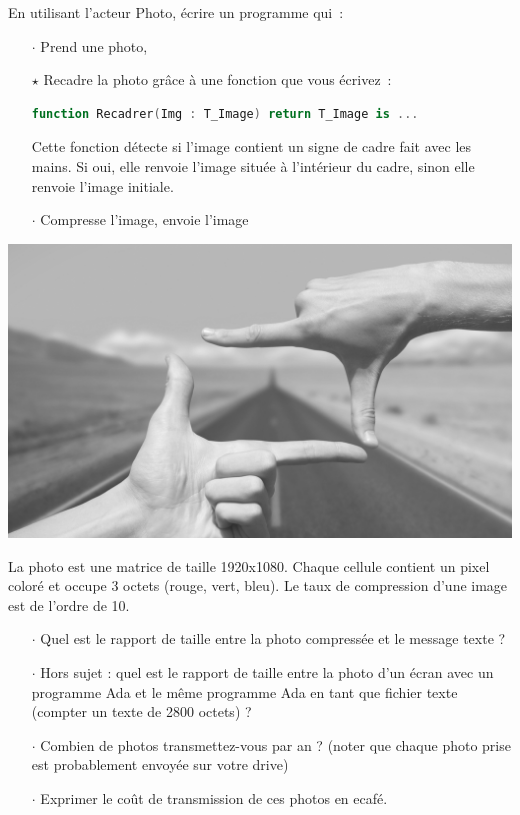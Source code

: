 \begin{minipage}[t]{0.74\textwidth}
En utilisant l'acteur Photo, écrire un programme qui~:

\begin{itemize}
\item[$\cdot$] Prend une photo,
\item[$\star$] Recadre la photo grâce à une fonction que vous écrivez~:
  \begin{lstlisting}[language=Ada]
    function Recadrer(Img : T_Image) return T_Image is ...
  \end{lstlisting}
  Cette fonction détecte si l'image contient un signe de cadre fait avec les mains. Si oui, elle renvoie l'image située à l'intérieur du cadre, sinon elle renvoie l'image initiale.

\item[$\cdot$] Compresse l'image, envoie l'image
\end{itemize}
\end{minipage}
\hfill
\begin{minipage}[t]{0.25\textwidth}
\includegraphics[width=\linewidth,valign=t]{frame.png}
\end{minipage}
\medskip

\begin{reponse}

\end{reponse}


La photo est une matrice de taille 1920x1080. Chaque cellule contient un pixel coloré et occupe 3 octets (rouge, vert, bleu).
Le taux de compression d'une image est de l'ordre de 10.

\begin{itemize}
\item[$\cdot$] Quel est le rapport de taille entre la photo compressée et le message texte ?
\item[$\cdot$] Hors sujet : quel est le rapport de taille entre la photo d'un écran avec un programme Ada et le même programme Ada en tant que fichier texte (compter un texte de 2800 octets) ?
\item[$\cdot$] Combien de photos transmettez-vous par an ? (noter que chaque photo prise est probablement envoyée sur votre drive)
\item[$\cdot$] Exprimer le coût de transmission de ces photos en ecafé.
\end{itemize}

